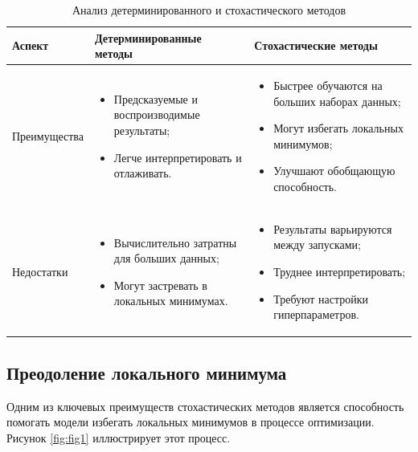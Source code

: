 \documentclass[11pt,a4paper]{article}
\begin{document}
\begin{table}
	\caption{Анализ детерминированного и стохастического методов}
	\label{table:1}
	\begin{tabular}{|p{}|>{\raggedright\arraybackslash}p{}|>{\raggedright\arraybackslash}p{}|}
		\hline
		Аспект & Детерминированные методы & Стохастические методы \\
		\hline
		Преиму\-щества  & \begin{itemize}[leftmargin=*,label=--, nosep] 
		\item Предсказуемые и воспроизводимые результаты;
		\item Легче интерпретировать и отлаживать.
		\end{itemize}
		        
		& \begin{itemize}[leftmargin=*,label=--, nosep]
		\item Быстрее обучаются на больших наборах данных;
		\item Могут избегать локальных минимумов;
		\item Улучшают обобщающую способность.
		\end{itemize} \\
		\hline
		Недо\-статки & \begin{itemize}[leftmargin=*,label=--, nosep]
		\item Вычислительно затратны для больших данных;
		\item Могут застревать в локальных минимумах.
		\end{itemize}
		& \begin{itemize}[leftmargin=*,label=--, nosep]
		\item Результаты варьируются между запусками;
		\item Труднее интерпретировать;
		\item Требуют настройки гиперпараметров.
		\end{itemize} \\
		\hline
	\end{tabular}
\end{table}


\subsection{Преодоление локального минимума}

Одним из ключевых преимуществ стохастических методов является способность помогать модели избегать локальных минимумов в процессе оптимизации. Рисунок \ref{fig:fig1} иллюстрирует этот процесс.
\end{document}
